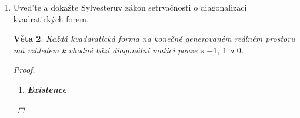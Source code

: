 \documentclass[10pt,a4paper]{article}
\theoremstyle{plain}
\newtheorem{veta}{Věta}
\begin{document}
\begin{enumerate}
\begin{veta}
\begin{proof}
\begin{itemize}
Pak 

\[P_nA_nP_n^T =  \begin{array}{|c|c|} \hline  \alpha & 0^T  \\ \hline  0 & A_{n-1} \\ \hline \end{array} \]

Kde $A_{n-1} = \tilde{A} - \frac{1}{\alpha} aa^T$ je symetrická.

Dle indukčního předpokladu $\exists R_{n-1}$ pro $A_{n-1}$

Zvolíme $R_n = \begin{array}{|c|c|} \hline  1 & 0^T  \\ \hline 0 & R_{n-1} \\ \hline \end{array} \cdot P_n$

Pak $ R_nA_nR_n^T = \begin{array}{|c|c|} \hline  \alpha & 0^T  \\ \hline 0 & R_{n-1}A_{n-1}R_{n-1}^T \\ \hline \end{array}  $ je diagonální.

\item $\alpha = 0$ a $a \neq 0$, pak $a_{i,1} \neq 0$ pro nějaké $i$.

Použijeme elementární matici $E$ pro přičtení $i$-tého řádku k prvnímu, vezmeme $A^\prime = EAE^T$ namísto $A$ a můžeme postupovat jako v prvním případě.

\item $\alpha = 0$ a $a = 0$, vezmeme $A_{n-1} = \tilde{A}$ a $R_n = \begin{array}{|c|c|} \hline  1 & 0^T  \\ \hline 0 & R_{n-1} \\ \hline \end{array} $

\end{itemize}
\end{proof}
\end{veta}

\item Uved'te a dokažte Sylvesterův zákon setrvačnosti o diagonalizaci kvadratických forem.
\begin{veta}
Každá kvaddratická forma na konečně generovaném reálném prostoru má vzhledem k vhodné bázi diagonální matici pouze s $-1$, $1$ a $0$.
\begin{proof}
\begin{enumerate}
\item \textbf{Existence}


\end{enumerate}
\end{proof}
\end{veta}
\end{enumerate}
\end{document}
